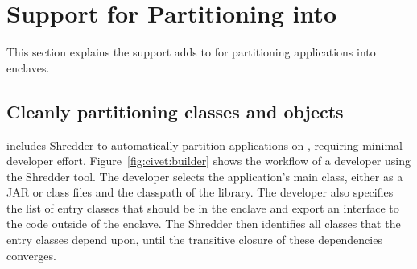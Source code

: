 \section{\java{} Support for Partitioning into \sgx{}}
\label{sec:civet:concept}

This section explains the support \sysname{} adds to \java{}
for partitioning applications into \sgx{} enclaves.

\subsection{Cleanly partitioning classes and objects}
\label{sec:civet:concept:partition}


\sysname{} includes Shredder to automatically partition \java{} applications on \sgx{},
requiring  minimal developer effort.
Figure~\ref{fig:civet:builder} shows the workflow of a developer using the \sysname{} Shredder tool.
The developer selects the application's main class, either as a JAR or class files
and the classpath of the library.
The developer also specifies the list of
entry classes that should be in the enclave and export an interface to the code 
outside of the enclave.
The Shredder then
identifies all classes that the entry classes depend upon,
until the transitive closure of these dependencies converges.

